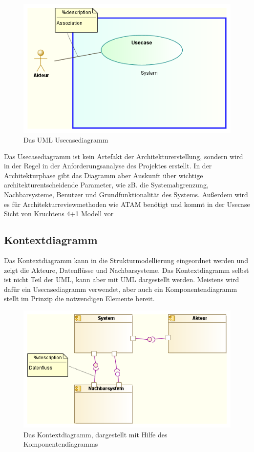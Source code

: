 \begin{figure}[H]
    \centering
    \includegraphics[scale=0.8]{uml/modelling/usecase.png}
    \caption{Das UML Usecasediagramm}
    \label{fig:umlusecasemodel}
\end{figure}

Das Usecasediagramm ist kein Artefakt der Architekturerstellung, sondern wird in der Regel in der Anforderungsanalyse des Projektes erstellt. In der Architekturphase gibt das Diagramm aber Auskunft über wichtige architekturentscheidende Parameter, wie zB. die Systemabgrenzung, Nachbarsysteme, Benutzer und Grundfunktionalität des Systems. Außerdem wird es für Architekturreviewmethoden wie ATAM benötigt und kommt in der Usecase Sicht von Kruchtens 4+1 Modell vor \cite[S. 148]{basiswissen}

\subsection{Kontextdiagramm}
Das Kontextdiagramm kann in die Strukturmodellierung eingeordnet werden und zeigt die Akteure, Datenflüsse und Nachbarsysteme. Das Kontextdiagramm selbst ist nicht Teil der UML, kann aber mit UML dargestellt werden. Meistens wird dafür ein Usecasediagramm verwendet, aber auch ein Komponentendiagramm stellt im Prinzip die notwendigen Elemente bereit. \cite[S. 255]{glasklar}

\begin{figure}[H]
    \centering
    \includegraphics[scale=0.8]{uml/modelling/context.png}
    \caption{Das Kontextdiagramm, dargestellt mit Hilfe des Komponentendiagramms}
    \label{fig:umlcontextmodel}
\end{figure}

